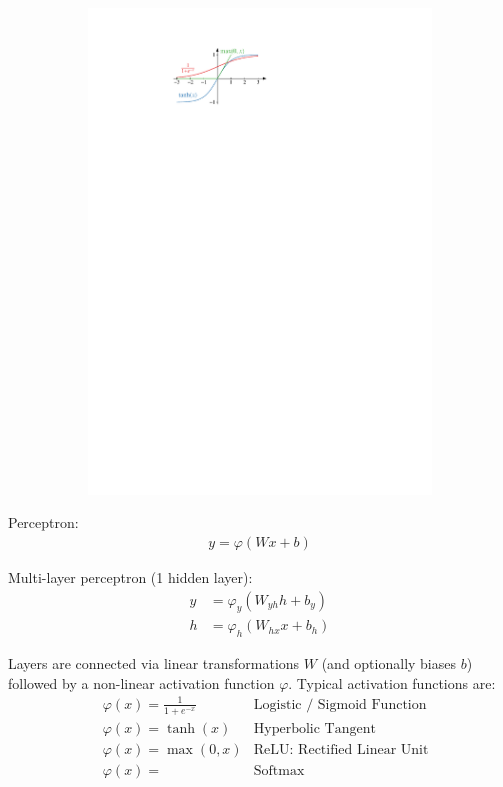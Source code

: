 \begin{figure}[ht]
\begin{subfigure}[t]{0.4\textwidth}
    \centering \includegraphics{./figures/theory/activation_functions.pdf}
    \label{fig:activation_functions}
  \end{subfigure}
\end{figure}

Perceptron:
\begin{align*}
  y = \varphi(W x + b)
\end{align*}

Multi-layer perceptron (1 hidden layer):
\begin{align*}
  y &= \varphi_y(W_{yh} h + b_y) \\
  h &= \varphi_h(W_{hx} x + b_h)
\end{align*}

Layers are connected via linear transformations $W$ (and optionally
biases $b$) followed by a non-linear activation function $\varphi$.
Typical activation functions are:
\begin{align*}
  &\varphi(x) = \frac{1}{1 + e^{-x}} &\text{Logistic / Sigmoid Function} \\
  &\varphi(x) = \tanh(x) &\text{Hyperbolic Tangent} \\
  &\varphi(x) = \max(0, x) &\text{ReLU: Rectified Linear Unit} \\
  &\varphi(x) = &\text{Softmax}
\end{align*}

